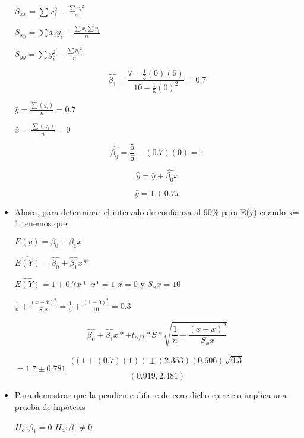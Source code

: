 \documentclass{../oxmathproblems}
\begin{document}
\begin{questions}
\begin{itemize}
$ S_{xx} = \sum{x_i^2} - \frac{\sum{x_i}^2}{n}$  

$ S_{xy} = \sum{x_iy_i} - \frac{\sum{x_i}\sum{y_i}}{n} $

$ S_{yy} = \sum{y_i^2} - \frac{\sum{y_i}^2}{n}$  

$$ \hat{\beta_1} = \frac{7- \frac{1}{5}(0)(5)}{10- \frac{1}{5}(0)^2} = 0.7  
$$ 


$ \bar{y} = \frac{\sum(y_i)}{n} = 0.7 $

$ \bar{x} = \frac{\sum(x_i)}{n} =  0 $ 

$$
\hat{\beta_0} = \frac{5}{5} - (0.7)(0) = 1 
$$ 


$$ \hat{y} = \bar{y} +\hat{\beta_0}x $$ 

$$  \hat{y} = 1 + 0.7x $$ 

\item Ahora, para determinar el intervalo de confianza al 90$\%$ para E(y) cuando x= 1 tenemos que: 

$ E(y) = \beta_0 + \beta_1x$ 

$ \hat{E(Y)} = \hat{\beta_0} + \hat{\beta_1}x* $  

$ \hat{E(Y)} = 1+ 0.7x* $ 
 $ x* = 1$  $\bar{x} = 0 $ y $S_xx = 10 $ 



$ \frac{1}{n} + \frac{(x-\bar{x})^2}{S_xx} = \frac{1}{5} + \frac{(1-0)^2}{10} = 0.3 $



$$ 
\hat{\beta_0} + \hat{\beta_1}x* \pm t_{\alpha/2} *S* \sqrt {\frac{1}{n} + \frac{(x-\bar{x})^2}{S_xx}}
$$ 

$$
((1+(0.7)(1)) \pm (2.353)(0.606)\sqrt{0.3}
$$
$
= 1.7 \pm 0.781 
$ 
$$ (0.919,2.481) $$ 

\item Para demostrar que la pendiente difiere de cero dicho ejercicio implica una prueba de hipótesis


$ H_o: \beta_1 = 0 $    $ H_a : \beta_1 \neq 0 $ 


\end{itemize}
\end{questions}
\end{document}
